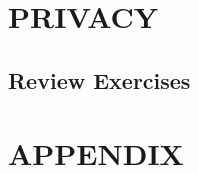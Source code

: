 \documentclass[a4paper, 10 pt, conference]{ieeeconf}
\begin{document}
\section{\textbf{PRIVACY}}
\subsection{\textbf{Review Exercises}}

\section*{APPENDIX}



\end{document}
